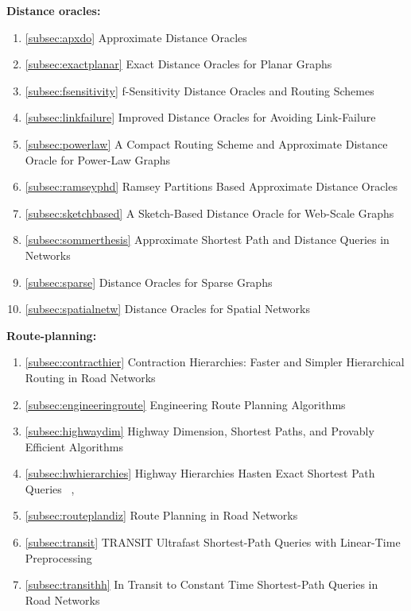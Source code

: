 \documentclass[a4paper]{article}
\begin{document}
        \textbf{Distance oracles: }
        \begin{enumerate}
            \item \ref{subsec:apxdo} Approximate Distance Oracles ~\cite{apxdo05}
            \item \ref{subsec:exactplanar} Exact Distance Oracles for Planar Graphs ~\cite{exactplanar10}
            \item \ref{subsec:fsensitivity} f-Sensitivity Distance Oracles and Routing Schemes ~\cite{fsensitivity10}
            \item \ref{subsec:linkfailure} Improved Distance Oracles for Avoiding Link-Failure ~\cite{linkfailure02}
            \item \ref{subsec:powerlaw} A Compact Routing Scheme and Approximate Distance Oracle for Power-Law Graphs ~\cite{powerlaw09}
            \item \ref{subsec:ramseyphd} Ramsey Partitions Based Approximate Distance Oracles ~\cite{ramseyphd08}
            \item \ref{subsec:sketchbased} A Sketch-Based Distance Oracle for Web-Scale Graphs ~\cite{sketchbased10}
            \item \ref{subsec:sommerthesis} Approximate Shortest Path and Distance Queries in Networks ~\cite{sommerthesis10}
            \item \ref{subsec:sparse} Distance Oracles for Sparse Graphs ~\cite{sparse09}
            \item \ref{subsec:spatialnetw} Distance Oracles for Spatial Networks ~\cite{spatialnetw09}
        \end{enumerate}
        \hspace*{\fill}

        \textbf{Route-planning: }
        \begin{enumerate}
            \item \ref{subsec:contracthier} Contraction Hierarchies: Faster and Simpler Hierarchical Routing in Road Networks ~\cite{contracthier08}
            \item \ref{subsec:engineeringroute} Engineering Route Planning Algorithms ~\cite{engineeringroute09}
            \item \ref{subsec:highwaydim} Highway Dimension, Shortest Paths, and Provably Efficient Algorithms ~\cite{highwaydim10}
            \item \ref{subsec:hwhierarchies} Highway Hierarchies Hasten Exact Shortest Path Queries ~\cite{hwhierarchies05},
            \item \ref{subsec:routeplandiz} Route Planning in Road Networks ~\cite{routeplandiz08}
            \item \ref{subsec:transit} TRANSIT Ultrafast Shortest-Path Queries with Linear-Time Preprocessing~\cite{transit06}
            \item \ref{subsec:transithh} In Transit to Constant Time Shortest-Path Queries in Road Networks ~\cite{transithh}
        \end{enumerate}
        \hspace*{\fill}
\end{document}
